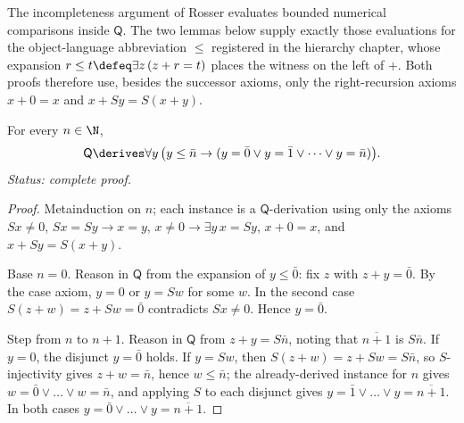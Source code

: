 
The incompleteness argument of Rosser evaluates bounded numerical
comparisons inside \(\mathsf Q\).  The two lemmas below supply exactly
those evaluations for the object-language abbreviation \(\leq\) registered
in the hierarchy chapter, whose expansion \(r\leq t\defeq\exists
z\,(z+r=t)\) places the witness on the left of \(+\).  Both proofs
therefore use, besides the successor axioms, only the right-recursion
axioms \(x+0=x\) and \(x+Sy=S(x+y)\).

\begin{lemma}
\label{lem:q-bounded-cases}
For every \(n\in\N\),
\[
  \mathsf Q\derives\forall y\,\bigl(y\leq\bar n\to
  (y=\bar0\lor y=\bar1\lor\dots\lor y=\bar n)\bigr).
\]
\textit{Status: complete proof.}
\end{lemma}

\begin{proof}
Metainduction on \(n\); each instance is a \(\mathsf Q\)-derivation using
only the axioms \(Sx\neq0\), \(Sx=Sy\to x=y\),
\(x\neq0\to\exists y\,x=Sy\), \(x+0=x\), and \(x+Sy=S(x+y)\).

Base \(n=0\).  Reason in \(\mathsf Q\) from the expansion of
\(y\leq\bar0\): fix \(z\) with \(z+y=\bar0\).  By the case axiom,
\(y=0\) or \(y=Sw\) for some \(w\).  In the second case
\(S(z+w)=z+Sw=\bar0\) contradicts \(Sx\neq0\).  Hence \(y=\bar0\).

Step from \(n\) to \(n+1\).  Reason in \(\mathsf Q\) from \(z+y=S\bar n\),
noting that \(\overline{n+1}\) is \(S\bar n\).  If \(y=0\), the disjunct
\(y=\bar0\) holds.  If \(y=Sw\), then \(S(z+w)=z+Sw=S\bar n\), so
\(S\)-injectivity gives \(z+w=\bar n\), hence \(w\leq\bar n\); the
already-derived instance for \(n\) gives
\(w=\bar0\lor\dots\lor w=\bar n\), and applying \(S\) to each disjunct
gives \(y=\bar1\lor\dots\lor y=\overline{n+1}\).  In both cases
\(y=\bar0\lor\dots\lor y=\overline{n+1}\).
\end{proof}
